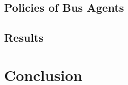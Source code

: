 \documentclass{sig-alternate}
\begin{document}
\subsection{Policies of Bus Agents}
\subsection{Results}

\section{Conclusion}
\end{document}
